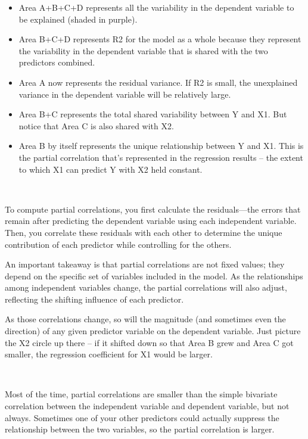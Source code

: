 \documentclass[
  letterpaper,
  DIV=11,
  numbers=noendperiod]{scrreprt}
\begin{document}
\begin{itemize}
\item
  Area A+B+C+D represents all the variability in the dependent variable
  to be explained (shaded in purple).\,\,
\item
  Area B+C+D represents R2 for the model as a whole because they
  represent the variability in the dependent variable that is shared
  with the two predictors combined.\,\,
\item
  Area A now represents the residual variance. If R2 is small, the
  unexplained variance in the dependent variable will be relatively
  large.\,\,
\item
  Area B+C represents the total shared variability between Y and X1. But
  notice that Area C is also shared with X2.\,\,
\item
  Area B by itself represents the unique relationship between Y and X1.
  This is the partial correlation that's represented in the regression
  results -- the extent to which X1 can predict Y with X2 held
  constant.\,
\end{itemize}

\,

To compute partial correlations, you first calculate the residuals---the
errors that remain after predicting the dependent variable using each
independent variable. Then, you correlate these residuals with each
other to determine the unique contribution of each predictor while
controlling for the others.

An important takeaway is that partial correlations are not fixed values;
they depend on the specific set of variables included in the model. As
the relationships among independent variables change, the partial
correlations will also adjust, reflecting the shifting influence of each
predictor.

As those correlations change, so will the magnitude (and sometimes even
the direction) of any given predictor variable on the dependent
variable. Just picture the X2 circle up there -- if it shifted down so
that Area B grew and Area C got smaller, the regression coefficient for
X1 would be larger.\,\,

\,

Most of the time, partial correlations are smaller than the simple
bivariate correlation between the independent variable and dependent
variable, but not always. Sometimes one of your other predictors could
actually suppress the relationship between the two variables, so the
partial correlation is larger.\,
\end{document}

